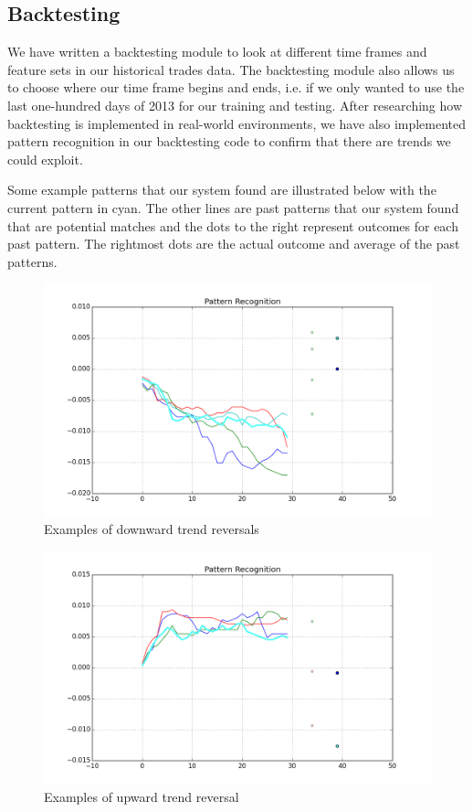 \documentclass{article}
\begin{document}
\subsection{Backtesting}
We have written a backtesting module to look at different time frames and feature sets in our historical trades data. The backtesting module also allows us to choose where our time frame begins and ends, i.e. if we only wanted to use the last one-hundred days of 2013 for our training and testing. After researching how backtesting is implemented in real-world environments, we have also implemented pattern recognition in our backtesting code to confirm that there are trends we could exploit.

Some example patterns that our system found are illustrated below with the current pattern in cyan. The other lines are past patterns that our system found that are potential matches and the dots to the right represent outcomes for each past pattern.  The rightmost dots are the actual outcome and average of the past patterns.

\begin{figure}[h!]
\begin{center}
        \includegraphics[scale=0.3]{figure_2}
        \caption{Examples of downward trend reversals}
\end{center}
\end{figure}

\begin{figure}[h!]
\begin{center}
        \includegraphics[scale=0.3]{figure_3}
        \caption{Examples of upward trend reversal}
\end{center}
\end{figure}
\end{document}
